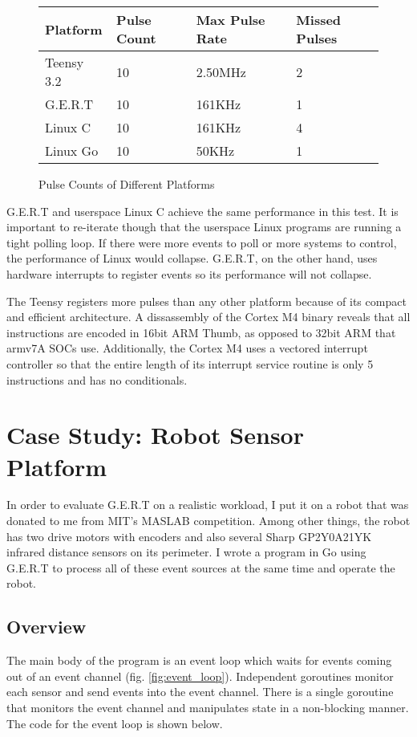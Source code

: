 \begin{figure} [h]
\begin{center}
  \begin{tabular}{ | l | l | l | l |}
    \hline
    Platform & Pulse Count & Max Pulse Rate & Missed Pulses \\ \hline
    Teensy 3.2 & 10 & 2.50MHz & 2 \\ \hline
    G.E.R.T & 10 & 161KHz & 1 \\ \hline
    Linux C & 10 & 161KHz & 4 \\ \hline
    Linux Go & 10 & 50KHz & 1 \\
    \hline
  \end{tabular}
\end{center}
  \caption{Pulse Counts of Different Platforms}  \label{fig:counter}
\end{figure}

G.E.R.T and userspace Linux C achieve the same performance in this test.
It is important to re-iterate though that the userspace Linux programs
are running a tight polling loop. If there were more events to poll or more
systems to control, the performance of Linux would collapse. G.E.R.T, on the
other hand, uses hardware interrupts to register events so its performance will not
collapse.

The Teensy registers more pulses than any other platform because of its
compact and efficient architecture. A dissassembly of the Cortex M4 binary
reveals that all instructions are encoded in 16bit ARM Thumb, as opposed to
32bit ARM that armv7A SOCs use. Additionally, the Cortex M4 uses a vectored
interrupt controller so that the entire length of its interrupt service routine
is only 5 instructions and has no conditionals.

\section{Case Study: Robot Sensor Platform} \label{sec:robot}
In order to evaluate G.E.R.T on a realistic workload, I put it on a robot that was
donated to me from MIT's MASLAB competition. Among other things, the robot has two drive
motors with encoders and also several Sharp GP2Y0A21YK infrared distance sensors on its perimeter.
I wrote a program in Go using G.E.R.T to process all of these event sources at the same time
and operate the robot.

\subsection{Overview}
The main body of the program is an event loop which waits for events coming out of an event channel (fig. \ref{fig:event_loop}).
Independent goroutines monitor each sensor and send events into the event channel. There is a
single goroutine that monitors the event channel and manipulates state in a non-blocking manner. The code for the
event loop is shown below.

